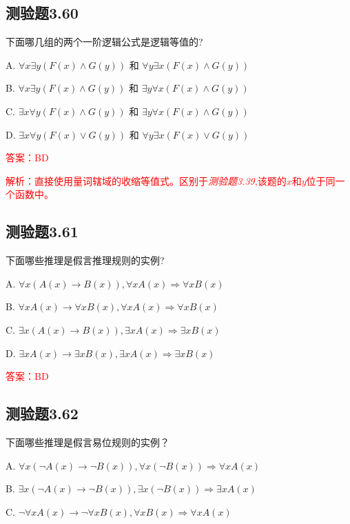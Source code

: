 \documentclass[UTF8, heading=true]{ctexart}
\begin{document}
\subsection{测验题3.60}

下面哪几组的两个一阶逻辑公式是逻辑等值的?

A. $\forall x \exists y(F(x) \wedge G(y))$ 和 $\forall y \exists x(F(x) \wedge G(y))$

B. $\forall x \exists y(F(x) \wedge G(y))$ 和 $\exists y \forall x(F(x) \wedge G(y))$

C. $\exists x \forall y(F(x) \wedge G(y))$ 和 $\exists y \forall x(F(x) \wedge G(y))$

D. $ \exists x \forall y(F(x) \vee G(y))$ 和 $\forall y \exists x(F(x) \vee G(y))$

\textcolor{red}{答案：BD}

\textcolor{red}{解析：直接使用量词辖域的收缩等值式。区别于\textit{测验题3.39},该题的$x$和$y$位于同一个函数中。}

\subsection{测验题3.61}

下面哪些推理是假言推理规则的实例?

A. $\forall x(A(x) \rightarrow B(x)),  \forall x A(x) \Longrightarrow \forall x B(x)$

B. $\forall x A(x) \rightarrow \forall x B(x), \forall x A(x) \Longrightarrow \forall x B(x)$

C. $\exists x(A(x) \rightarrow B(x)),  \exists x A(x) \Longrightarrow \exists x B(x)$

D. $\exists x A(x) \rightarrow \exists x B(x), \exists x A(x) \Longrightarrow \exists x B(x)$

\textcolor{red}{答案：BD}


\subsection{测验题3.62}

下面哪些推理是假言易位规则的实例？

A. $\forall x(\neg A(x) \rightarrow \neg B(x)),  \forall x(\neg B(x)) \Longrightarrow \forall x A(x)$

B. $\exists x(\neg A(x) \rightarrow \neg B(x)),  \exists x(\neg B(x)) \Longrightarrow \exists x A(x)$

C. $\neg \forall x A(x) \rightarrow \neg \forall x B(x), \forall x B(x) \Longrightarrow \forall x A(x)$
\end{document}
